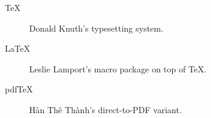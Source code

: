 \documentclass{article}
\begin{document}
\begin{description}
  \item[TeX] Donald Knuth's typesetting system.
  \item[LaTeX] Leslie Lamport's macro package on top of TeX.
  \item[pdfTeX] Hàn Thê Thành's direct-to-PDF variant.
\end{description}
\end{document}
